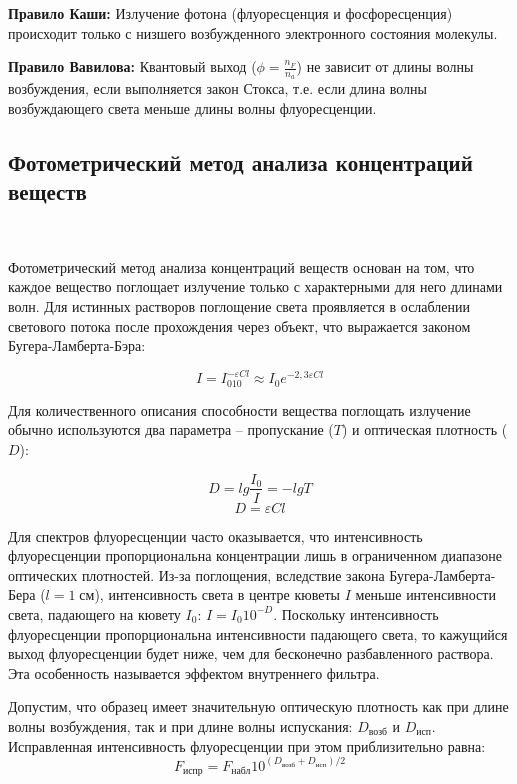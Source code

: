 \documentclass{article}
\begin{document}
\textbf{Правило Каши:} Излучение фотона (флуоресценция и фосфоресценция) происходит только с низшего возбужденного электронного состояния молекулы. 

\textbf{Правило Вавилова:} Квантовый выход ($\phi = \frac{n_F}{n_a}$) не зависит от длины волны возбуждения, если выполняется закон Стокса, т.е. если длина волны возбуждающего света меньше длины волны флуоресценции.

\subsection{Фотометрический метод анализа концентраций веществ}\
\par Фотометрический метод анализа концентраций веществ основан на том, что каждое
вещество поглощает излучение только с характерными для него длинами волн.
Для истинных растворов поглощение света проявляется в ослаблении светового
потока после прохождения через объект, что выражается законом Бугера-Ламберта-Бэра:

\begin{equation}
    I = I_010^{-\varepsilon Cl} \approx I_0e^{-2,3\varepsilon Cl}
\end{equation}

Для количественного описания способности вещества поглощать излучение обычно
используются два параметра – пропускание ($T$) и оптическая плотность ($D$):

\begin{equation}
    D = lg \frac{I_0}{I} = -lgT
\end{equation}
\begin{equation}
    D = \varepsilon Cl
\end{equation}

Для спектров флуоресценции часто
оказывается, что интенсивность флуоресценции пропорциональна концентрации лишь в ограниченном диапазоне оптических плотностей. Из-за поглощения, вследствие закона Бугера-Ламберта-Бера ($l = 1\;$см),
интенсивность света в центре кюветы $I$ меньше интенсивности света, падающего на кювету $I_0$: $I = I_0 10^{-D}$. Поскольку интенсивность флуоресценции пропорциональна интенсивности падающего света, то кажущийся выход флуоресценции будет ниже, чем для бесконечно разбавленного раствора. Эта особенность называется эффектом внутреннего
фильтра.

Допустим, что образец имеет значительную оптическую плотность как при длине
волны возбуждения, так и при длине волны испускания: $D_{\text{возб}}$ и $D_{\text{исп}}$. 
Исправленная интенсивность флуоресценции при этом приблизительно равна:
\begin{equation}
    F_{\text{испр}} = F_{\text{набл}} 10^{(D_{\text{возб}} + D_{\text{исп}})/2}
\end{equation}
\end{document}
